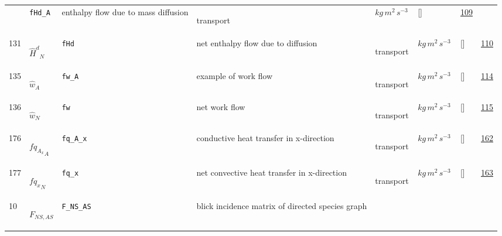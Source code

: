 \begin{longtable}{|p{1cm}|p{3cm}|p{3cm}|p{7cm}|p{3.0cm}|p{3cm}|p{2cm}|p{1cm}|}
             & \verb|fHd_A|
             & enthalpy flow due to mass diffusion
             & \begin{lay}transport \end{lay}
             & $ kg \,m^{2} \,s^{-3} \, $
             & []
             & \hyperlink{"e:109"}{ 109 }
                 \\
    131
             & \hypertarget{"v:131"}{ $ {\hat{H}^{d}}_{N} $}
             & \verb|fHd|
             & net enthalpy flow due to diffusion
             & \begin{lay}transport \end{lay}
             & $ kg \,m^{2} \,s^{-3} \, $
             & []
             & \hyperlink{"e:110"}{ 110 }
                 \\
    135
             & \hypertarget{"v:135"}{ $ {\hat{w}}_{A} $}
             & \verb|fw_A|
             & example of work flow
             & \begin{lay}transport \end{lay}
             & $ kg \,m^{2} \,s^{-3} \, $
             & []
             & \hyperlink{"e:114"}{ 114 }
                 \\
    136
             & \hypertarget{"v:136"}{ $ {\hat{w}}_{N} $}
             & \verb|fw|
             & net work flow
             & \begin{lay}transport \end{lay}
             & $ kg \,m^{2} \,s^{-3} \, $
             & []
             & \hyperlink{"e:115"}{ 115 }
                 \\
    176
             & \hypertarget{"v:176"}{ $ {fq_A_x}_{A} $}
             & \verb|fq_A_x|
             & conductive heat transfer in x-direction
             & \begin{lay}transport \end{lay}
             & $ kg \,m^{2} \,s^{-3} \, $
             & []
             & \hyperlink{"e:162"}{ 162 }
                 \\
    177
             & \hypertarget{"v:177"}{ $ {fq_x}_{N} $}
             & \verb|fq_x|
             & net convective heat transfer in x-direction
             & \begin{lay}transport \end{lay}
             & $ kg \,m^{2} \,s^{-3} \, $
             & []
             & \hyperlink{"e:163"}{ 163 }
                 \\
    10
             & \hypertarget{"v:10"}{ $ {F}_{{N S}, {A S}} $}
             & \verb|F_NS_AS|
             & blick incidence matrix of directed species graph

\end{longtable}
